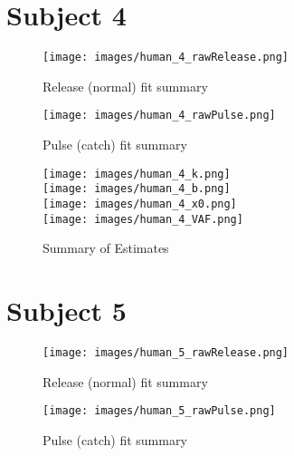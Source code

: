 \documentclass[12pt]{spie}
\begin{document}
\section{Subject 4}

\begin{figure}[H]
\begin{center}
\texttt{[image: images/human\_4\_rawRelease.png]}
\caption[]{Release (normal) fit summary}
\end{center}
\end{figure}

\begin{figure}[H]
\begin{center}
\texttt{[image: images/human\_4\_rawPulse.png]}
\caption[]{Pulse (catch) fit summary}
\end{center}
\end{figure}

\begin{figure}[H]
\begin{center}
\texttt{[image: images/human\_4\_k.png]} \\
\texttt{[image: images/human\_4\_b.png]} \\
\texttt{[image: images/human\_4\_x0.png]} \\
\texttt{[image: images/human\_4\_VAF.png]} \\
\caption[]{Summary of Estimates}
\end{center}
\end{figure}

\section{Subject 5}

\begin{figure}[H]
\begin{center}
\texttt{[image: images/human\_5\_rawRelease.png]}
\caption[]{Release (normal) fit summary}
\end{center}
\end{figure}

\begin{figure}[H]
\begin{center}
\texttt{[image: images/human\_5\_rawPulse.png]}
\caption[]{Pulse (catch) fit summary}
\end{center}
\end{figure}
\end{document}

